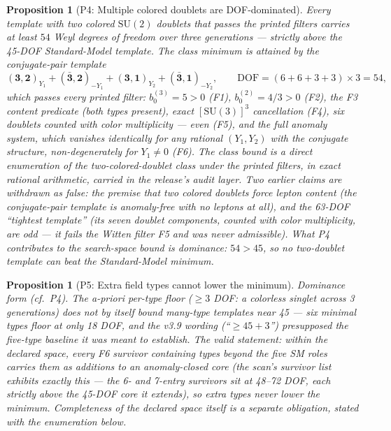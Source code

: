 \documentclass[11pt]{article}
\newtheorem{proposition}[theorem]{Proposition}
\theoremstyle{definition}
\newcommand{\SU}{\mathrm{SU}}
\begin{document}
\begin{proposition}[P4: Multiple colored doublets are DOF-dominated]
\label{prop:P4}
Every template with two colored $\SU(2)$ doublets that passes the
printed filters carries at least $54$ Weyl degrees of freedom over
three generations --- strictly above the 45-DOF Standard-Model
template.  The class minimum is attained by the conjugate-pair
template
\[
(\mathbf{3},\mathbf{2})_{Y_1} + (\bar{\mathbf{3}},\mathbf{2})_{-Y_1} +
(\mathbf{3},\mathbf{1})_{Y_2} + (\bar{\mathbf{3}},\mathbf{1})_{-Y_2},
\qquad \mathrm{DOF} = (6+6+3+3) \times 3 = 54,
\]
which passes every printed filter: $b_0^{(3)} = 5 > 0$ (F1),
$b_0^{(2)} = 4/3 > 0$ (F2), the F3 content predicate (both types
present), exact $[\SU(3)]^3$ cancellation (F4), six doublets counted
with color multiplicity --- even (F5), and the full anomaly system,
which vanishes identically for \emph{any} rational $(Y_1, Y_2)$ with
the conjugate structure, non-degenerately for $Y_1 \neq 0$ (F6).  The
class bound is a direct enumeration of the two-colored-doublet class
under the printed filters, in exact rational arithmetic, carried in
the release's audit layer.  Two earlier claims are withdrawn as
false: the premise that two colored doublets force lepton content
(the conjugate-pair template is anomaly-free with no leptons at all),
and the 63-DOF ``tightest template'' (its seven doublet components,
counted with color multiplicity, are odd --- it fails the Witten
filter F5 and was never admissible).  What P4 contributes to the
search-space bound is dominance: $54 > 45$, so no two-doublet
template can beat the Standard-Model minimum.
\end{proposition}

\begin{proposition}[P5: Extra field types cannot lower the minimum]
\label{prop:P5}
Dominance form (cf.\ P4).  The a-priori per-type floor ($\ge 3$ DOF:
a colorless singlet across 3 generations) does \emph{not} by itself
bound many-type templates near 45 --- six minimal types floor at only
18 DOF, and the v3.9 wording (``$\ge 45 + 3$'') presupposed the
five-type baseline it was meant to establish.  The valid statement:
within the declared space, every F6 survivor containing types beyond
the five SM roles carries them as additions to an anomaly-closed core
(the scan's survivor list exhibits exactly this --- the 6- and 7-entry
survivors sit at 48--72 DOF, each strictly above the 45-DOF core it
extends), so extra types never lower the minimum.  Completeness of the
declared space itself is a separate obligation, stated with the
enumeration below.
\end{proposition}
\end{document}

